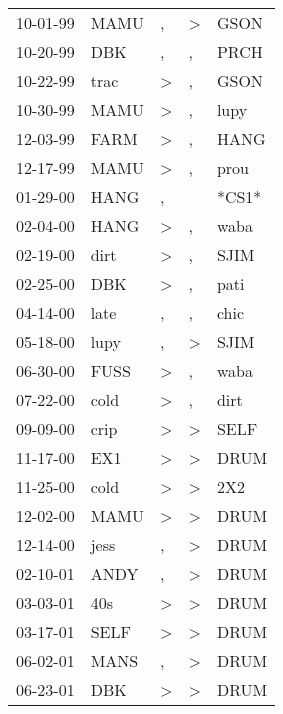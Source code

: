 \begin{supertabular}{lllll}
 10-01-99 &  MAMU &                , &     \textgreater &   GSON \\
 10-20-99 &   DBK &                , &                , &   PRCH \\
 10-22-99 &  trac &     \textgreater &                , &   GSON \\
 10-30-99 &  MAMU &     \textgreater &                , &   lupy \\
 12-03-99 &  FARM &     \textgreater &                , &   HANG \\
 12-17-99 &  MAMU &     \textgreater &                , &   prou \\
 01-29-00 &  HANG &                , &                  &  *CS1* \\
 02-04-00 &  HANG &     \textgreater &                , &   waba \\
 02-19-00 &  dirt &     \textgreater &                , &   SJIM \\
 02-25-00 &   DBK &     \textgreater &                , &   pati \\
 04-14-00 &  late &                , &                , &   chic \\
 05-18-00 &  lupy &                , &     \textgreater &   SJIM \\
 06-30-00 &  FUSS &     \textgreater &                , &   waba \\
 07-22-00 &  cold &     \textgreater &                , &   dirt \\
 09-09-00 &  crip &     \textgreater &     \textgreater &   SELF \\
 11-17-00 &   EX1 &     \textgreater &     \textgreater &   DRUM \\
 11-25-00 &  cold &     \textgreater &     \textgreater &    2X2 \\
 12-02-00 &  MAMU &     \textgreater &     \textgreater &   DRUM \\
 12-14-00 &  jess &                , &     \textgreater &   DRUM \\
 02-10-01 &  ANDY &                , &     \textgreater &   DRUM \\
 03-03-01 &   40s &     \textgreater &     \textgreater &   DRUM \\
 03-17-01 &  SELF &     \textgreater &     \textgreater &   DRUM \\
 06-02-01 &  MANS &                , &     \textgreater &   DRUM \\
 06-23-01 &   DBK &     \textgreater &     \textgreater &   DRUM \\

\end{supertabular}
